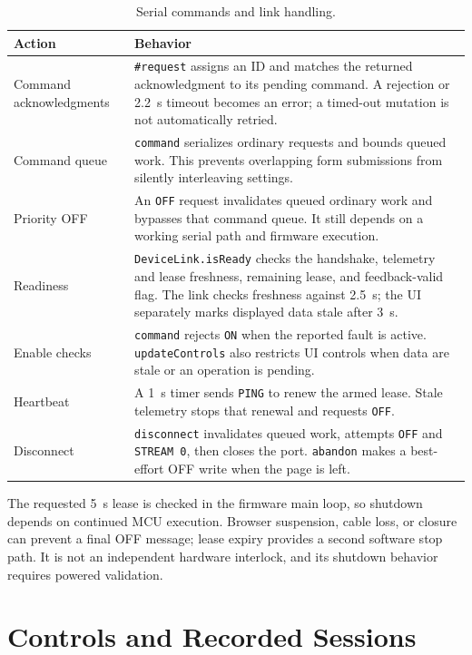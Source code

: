 \begin{table}[htbp]
\centering
\caption{Serial commands and link handling.}
\label{tab:app-link-behavior}
\small
\begin{tabularx}{\textwidth}{@{}L{0.26\textwidth}Y@{}}
\toprule
Action & Behavior\\
\midrule
Command acknowledgments & \texttt{\#request} assigns an ID and matches the returned acknowledgment to its pending command. A rejection or \SI{2.2}{\second} timeout becomes an error; a timed-out mutation is not automatically retried.\\
Command queue & \texttt{command} serializes ordinary requests and bounds queued work. This prevents overlapping form submissions from silently interleaving settings.\\
Priority OFF & An \texttt{OFF} request invalidates queued ordinary work and bypasses that command queue. It still depends on a working serial path and firmware execution.\\
Readiness & \texttt{DeviceLink.isReady} checks the handshake, telemetry and lease freshness, remaining lease, and feedback-valid flag. The link checks freshness against \SI{2.5}{\second}; the UI separately marks displayed data stale after \SI{3}{\second}.\\
Enable checks & \texttt{command} rejects \texttt{ON} when the reported fault is active. \texttt{updateControls} also restricts UI controls when data are stale or an operation is pending.\\
Heartbeat & A \SI{1}{\second} timer sends \texttt{PING} to renew the armed lease. Stale telemetry stops that renewal and requests \texttt{OFF}.\\
Disconnect & \texttt{disconnect} invalidates queued work, attempts \texttt{OFF} and \texttt{STREAM 0}, then closes the port. \texttt{abandon} makes a best-effort OFF write when the page is left.\\
\bottomrule
\end{tabularx}
\end{table}
\FloatBarrier

The requested \SI{5}{\second} lease is checked in the firmware main loop,
so shutdown depends on continued MCU execution. Browser suspension, cable
loss, or closure can prevent a final OFF message; lease expiry provides a
second software stop path. It is not an independent hardware interlock,
and its shutdown behavior requires powered validation.

\section{Controls and Recorded Sessions}
\label{sec:app-browser-recording}


